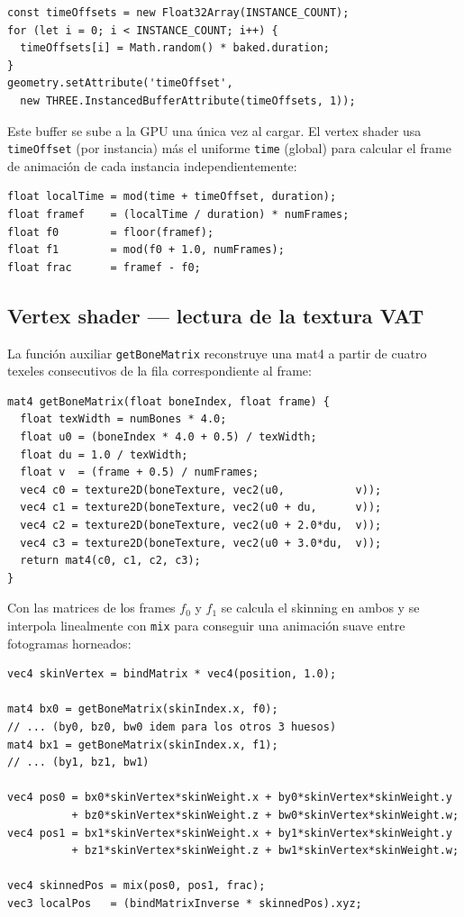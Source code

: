 \documentclass[12pt,a4paper]{article}
\begin{document}
\begin{lstlisting}[style=glsl, language={}]
const timeOffsets = new Float32Array(INSTANCE_COUNT);
for (let i = 0; i < INSTANCE_COUNT; i++) {
  timeOffsets[i] = Math.random() * baked.duration;
}
geometry.setAttribute('timeOffset',
  new THREE.InstancedBufferAttribute(timeOffsets, 1));
\end{lstlisting}

Este buffer se sube a la GPU una única vez al cargar. El vertex shader usa
\texttt{timeOffset} (por instancia) más el uniforme \texttt{time} (global)
para calcular el frame de animación de cada instancia independientemente:

\begin{lstlisting}[style=glsl, language={}]
float localTime = mod(time + timeOffset, duration);
float framef    = (localTime / duration) * numFrames;
float f0        = floor(framef);
float f1        = mod(f0 + 1.0, numFrames);
float frac      = framef - f0;
\end{lstlisting}

\subsection{Vertex shader — lectura de la textura VAT}

La función auxiliar \texttt{getBoneMatrix} reconstruye una mat4 a partir de cuatro
texeles consecutivos de la fila correspondiente al frame:

\begin{lstlisting}[style=glsl, language={}]
mat4 getBoneMatrix(float boneIndex, float frame) {
  float texWidth = numBones * 4.0;
  float u0 = (boneIndex * 4.0 + 0.5) / texWidth;
  float du = 1.0 / texWidth;
  float v  = (frame + 0.5) / numFrames;
  vec4 c0 = texture2D(boneTexture, vec2(u0,           v));
  vec4 c1 = texture2D(boneTexture, vec2(u0 + du,      v));
  vec4 c2 = texture2D(boneTexture, vec2(u0 + 2.0*du,  v));
  vec4 c3 = texture2D(boneTexture, vec2(u0 + 3.0*du,  v));
  return mat4(c0, c1, c2, c3);
}
\end{lstlisting}

Con las matrices de los frames $f_0$ y $f_1$ se calcula el skinning en ambos
y se interpola linealmente con \texttt{mix} para conseguir una animación suave
entre fotogramas horneados:

\begin{lstlisting}[style=glsl, language={}]
vec4 skinVertex = bindMatrix * vec4(position, 1.0);

mat4 bx0 = getBoneMatrix(skinIndex.x, f0);
// ... (by0, bz0, bw0 idem para los otros 3 huesos)
mat4 bx1 = getBoneMatrix(skinIndex.x, f1);
// ... (by1, bz1, bw1)

vec4 pos0 = bx0*skinVertex*skinWeight.x + by0*skinVertex*skinWeight.y
          + bz0*skinVertex*skinWeight.z + bw0*skinVertex*skinWeight.w;
vec4 pos1 = bx1*skinVertex*skinWeight.x + by1*skinVertex*skinWeight.y
          + bz1*skinVertex*skinWeight.z + bw1*skinVertex*skinWeight.w;

vec4 skinnedPos = mix(pos0, pos1, frac);
vec3 localPos   = (bindMatrixInverse * skinnedPos).xyz;
\end{lstlisting}
\end{document}

